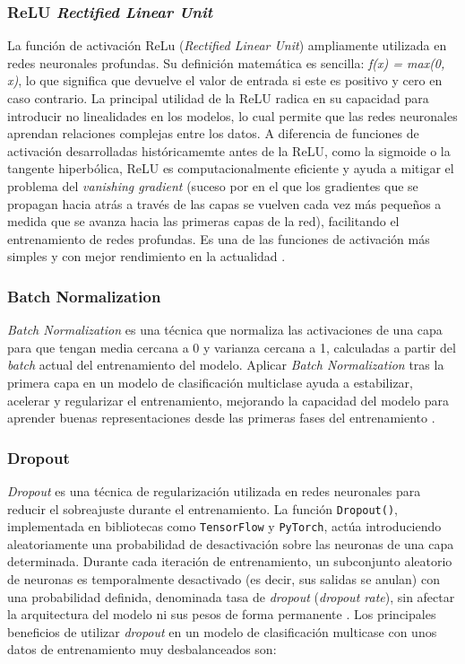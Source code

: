 \subsubsection{ReLU \textit{Rectified Linear Unit}}

La función de activación ReLu (\textit{Rectified Linear Unit}) ampliamente utilizada en redes neuronales profundas. Su definición matemática es sencilla: \textit{f(x) = max(0, x)}, lo que significa que devuelve el valor de entrada si este es positivo y cero en caso contrario. La principal utilidad de la ReLU radica en su capacidad para introducir no linealidades en los modelos, lo cual permite que las redes neuronales aprendan relaciones complejas entre los datos. A diferencia de funciones de activación desarrolladas históricamemte antes de la ReLU, como la sigmoide o la tangente hiperbólica, ReLU es computacionalmente eficiente y ayuda a mitigar el problema del \textit{vanishing gradient} (suceso por en el que los gradientes que se propagan hacia atrás a través de las capas se vuelven cada vez más pequeños a medida que se avanza hacia las primeras capas de la red), facilitando el entrenamiento de redes profundas. Es una de las funciones de activación más simples y con mejor rendimiento en la actualidad \cite{nair2010relu}.

\subsubsection{Batch Normalization}\label{subsubsection:bn}
\textit{Batch Normalization} es una técnica que normaliza las activaciones de una capa para que tengan media cercana a 0 y varianza cercana a 1, calculadas a partir del \textit{batch} actual del entrenamiento del modelo. Aplicar \textit{Batch Normalization} tras la primera capa en un modelo de clasificación multiclase ayuda a estabilizar, acelerar y regularizar el entrenamiento, mejorando la capacidad del modelo para aprender buenas representaciones desde las primeras fases del entrenamiento \cite{ioffe2015batch}.

\subsubsection{Dropout}
\textit{Dropout} es una técnica de regularización utilizada en redes neuronales para reducir el sobreajuste durante el entrenamiento. La función \texttt{Dropout()}, implementada en bibliotecas como \texttt{TensorFlow} y \texttt{PyTorch}, actúa introduciendo aleatoriamente una probabilidad de desactivación sobre las neuronas de una capa determinada. Durante cada iteración de entrenamiento, un subconjunto aleatorio de neuronas es temporalmente desactivado (es decir, sus salidas se anulan) con una probabilidad definida, denominada tasa de \textit{dropout} (\textit{dropout rate}), sin afectar la arquitectura del modelo ni sus pesos de forma permanente \cite{srivastava2014dropout}. Los principales beneficios de utilizar \textit{dropout} en un modelo de clasificación multicase con unos datos de entrenamiento muy desbalanceados son:

